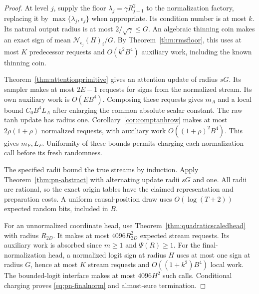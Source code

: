 \begin{proof}
At level $j$, supply the floor $\lambda_j=\gamma R_{j-1}^2$ to the
normalization factory, replacing it by $\max\{\lambda_j,\epsilon_j\}$
when appropriate. Its condition number is at most $k$. Its natural
output radius is at most $2/\sqrt\gamma\le G$. An algebraic thinning
coin makes an exact sign of mean $\mathcal N_{\epsilon_j}(H)_i/G$.
By Theorem~\ref{thm:rmsfloor}, this uses at most $K$ predecessor requests and $O(k^2B^4)$ auxiliary
work, including the known thinning coin.

Theorem~\ref{thm:attentionprimitive} gives an attention update of radius
$sG$. Its sampler makes at most $2E-1$ requests for signs from the
normalized stream. Its own auxiliary work is $O(EB^4)$.
Composing these requests gives $m_A$ and a local bound
$C_0B^4L_A$ after enlarging the common absolute scalar constant.
The raw tanh update has radius one. Corollary~\ref{cor:comptanhrow} makes at
most $2\rho(1+\rho)$ normalized requests, with auxiliary work
$O((1+\rho)^2B^4)$. This gives $m_F,L_F$. Uniformity of these bounds
permits charging each normalization call before its fresh randomness.

The specified radii bound the true streams by induction. Apply
Theorem~\ref{thm:pn-abstract} with alternating update radii $sG$ and one.
All radii are rational, so the exact origin tables have the claimed
representation and preparation costs. A uniform causal-position draw
uses $O(\log(T+2))$ expected random bits, included in $B$.

For an unnormalized coordinate head, use Theorem~\ref{thm:quadraticscaledhead} with radius $R_{2D}$. It makes at most $4096R_{2D}^2$ expected
stream requests. Its auxiliary work is absorbed since $m\ge1$ and $\Psi(R)\ge1$.
For the final-normalization head, a normalized logit sign at radius $H$
uses at most one sign at radius $G$, hence at most $K$ stream requests
and $O((1+k^2)B^4)$ local work. The bounded-logit interface makes at most
$4096H^2$ such calls. Conditional charging proves
\eqref{eq:pn-finalnorm} and almost-sure termination.
\end{proof}

